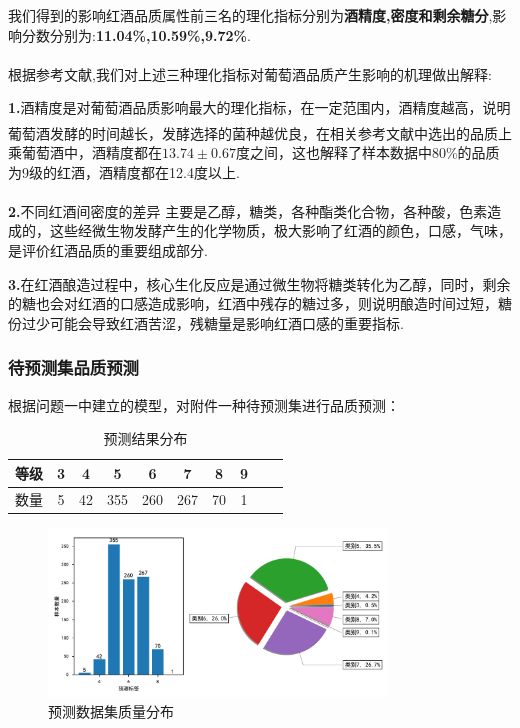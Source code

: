 \documentclass{whutmod}
\newcommand{\upcite}[1]{\textsuperscript{\textsuperscript{\cite{#1}}}}
\begin{document}
我们得到的影响红酒品质属性前三名的理化指标分别为\textbf{酒精度,密度和剩余糖分},影响分数分别为:\textbf{11.04\%,10.59\%,9.72\%}.

根据参考文献\upcite{bib:five}\upcite{bib:six},我们对上述三种理化指标对葡萄酒品质产生影响的机理做出解释:

\textbf{1.}酒精度是对葡萄酒品质影响最大的理化指标，在一定范围内，酒精度越高，说明葡萄酒发酵的时间越长，发酵选择的菌种越优良，在相关参考文献\upcite{bib:five}中选出的品质上乘葡萄酒中，酒精度都在$13.74\pm 0.67$度之间，这也解释了样本数据中80\%的品质为9级的红酒，酒精度都在12.4度以上.

\textbf{2.}不同红酒间密度的差异\upcite{bib:six} 主要是乙醇，糖类，各种酯类化合物，各种酸，色素造成的，这些经微生物发酵产生的化学物质，极大影响了红酒的颜色，口感，气味，是评价红酒品质的重要组成部分.

\textbf{3.}在红酒酿造过程中，核心生化反应是通过微生物将糖类转化为乙醇，同时，剩余的糖也会对红酒的口感造成影响，红酒中残存的糖过多，则说明酿造时间过短，糖份过少可能会导致红酒苦涩，残糖量是影响红酒口感的重要指标.

\subsubsection{待预测集品质预测}
根据问题一中建立的模型，对附件一种待预测集进行品质预测：
\begin{table}[!htbp]
	\caption{预测结果分布} \centering
	\begin{tabular}{cccccccccc}
		\toprule[1.5pt]
			等级 & 3 & 4 & 5 & 6 & 7 & 8 & 9 \\
		\midrule[1pt]
		数量 & 5 & 42 &355  & 260 & 267 &70  &1 \\
		\bottomrule[1.5pt]
	\end{tabular}
\end{table}

\begin{figure}[!h]
	\centering
	\includegraphics[width=0.8\textwidth]{labels_class_counts_test_pred.pdf}
	\caption{预测数据集质量分布}
\end{figure}
\end{document}
